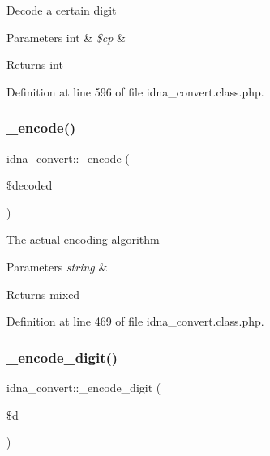 Decode a certain digit 
\begin{DoxyParams}[1]{Parameters}
int & {\em \$cp} & \\
\hline
\end{DoxyParams}
\begin{DoxyReturn}{Returns}
int 
\end{DoxyReturn}


Definition at line 596 of file idna\+\_\+convert.\+class.\+php.

\mbox{\label{classidna__convert_aa32f14e1635b5bcf8a1000721a53db8d}} 
\subsubsection{\texorpdfstring{\+\_\+encode()}{\_encode()}}
{\footnotesize\ttfamily idna\+\_\+convert\+::\+\_\+encode (\begin{DoxyParamCaption}\item[{}]{\$decoded }\end{DoxyParamCaption})\hspace{0.3cm}{\ttfamily [protected]}}

The actual encoding algorithm 
\begin{DoxyParams}{Parameters}
{\em string} & \\
\hline
\end{DoxyParams}
\begin{DoxyReturn}{Returns}
mixed 
\end{DoxyReturn}


Definition at line 469 of file idna\+\_\+convert.\+class.\+php.

\mbox{\label{classidna__convert_afdb30c72ac13c3c71922afb63fabb37c}} 
\subsubsection{\texorpdfstring{\+\_\+encode\+\_\+digit()}{\_encode\_digit()}}
{\footnotesize\ttfamily idna\+\_\+convert\+::\+\_\+encode\+\_\+digit (\begin{DoxyParamCaption}\item[{}]{\$d }\end{DoxyParamCaption})\hspace{0.3cm}{\ttfamily [protected]}}

